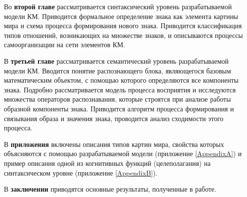Во \textbf{второй главе} рассматривается синтаксический уровень разрабатываемой модели КМ. Приводится формальное определение знака как элемента картины мира и схема процесса формирования нового знака. Приводится классификация типов отношений, возникающих на множестве знаков, и описываются процессы самоорганизации на сети элементов КМ.

В \textbf{третьей главе} рассматривается семантический уровень разрабатываемой модели КМ. Вводится понятие распознающего блока, являющегося базовым математическим объектом, с помощью которого определяются все компоненты знака. Подробно рассматривается модель процесса восприятия и исследуются множества операторов распознавания, которые строятся при анализе работы образной компоненты знака. Приводится алгоритм процесса формирования и связывания образа и значения знака, проводится анализ сходимости этого процесса.

В \textbf{приложения} включены описания типов картин мира, свойства которых объясняются с помощью разрабатываемой модели (приложение \ref{AppendixA}) и пример описания одной из когнитивных функций (целеполагания) на синтаксическом уровне (приложение \ref{AppendixB}).

В \textbf{заключении} приводятся основные результаты, полученные в работе.
\clearpage